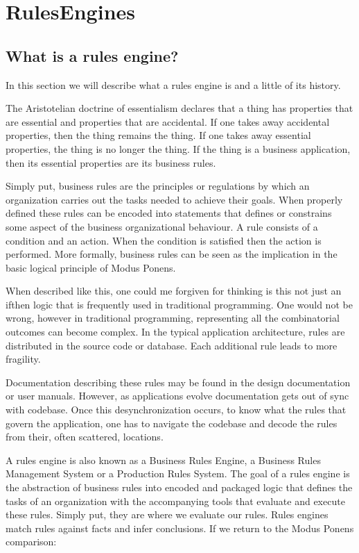 \section{RulesEngines}

\subsection{What is a rules engine?}

In this section we will describe what a rules engine is and a little of its history.

The Aristotelian doctrine of essentialism declares that a thing has properties that are essential and properties that are accidental.
If one takes away accidental properties, then the thing remains the thing.
If one takes away essential properties, the thing is no longer the thing.
If the thing is a business application, then its essential properties are its business rules.


Simply put, business rules are the principles or regulations by which an organization carries out the tasks needed to achieve their goals.
When properly defined these rules can be encoded into statements that defines or constrains some aspect of the business organizational behaviour.
A rule consists of a condition and an action.
When the condition is satisfied then the action is performed.
More formally, business rules can be seen as the implication in the basic logical principle of Modus Ponens.

When described like this, one could me forgiven for thinking is this not just an if\-then logic that is frequently used in traditional programming.
One would not be wrong, however in traditional programming, representing all the combinatorial outcomes can become complex.
In the typical application architecture, rules are distributed in the source code or database.
Each additional rule leads to more fragility.

Documentation describing these rules may be found in the design documentation or user manuals.
However, as applications evolve documentation gets out of sync with codebase.
Once this desynchronization occurs, to know what the rules that govern the application, one has to navigate the codebase and decode the rules from their, often scattered, locations.

A rules engine is also known as a Business Rules Engine, a Business Rules Management System or a Production Rules System.
The goal of a rules engine  is the abstraction of business rules into encoded and packaged logic that defines the tasks of an organization with the accompanying tools that evaluate and execute these rules.
Simply put, they are where we evaluate our rules.
Rules engines match rules against facts and infer conclusions.
If we return to the Modus Ponens comparison:

